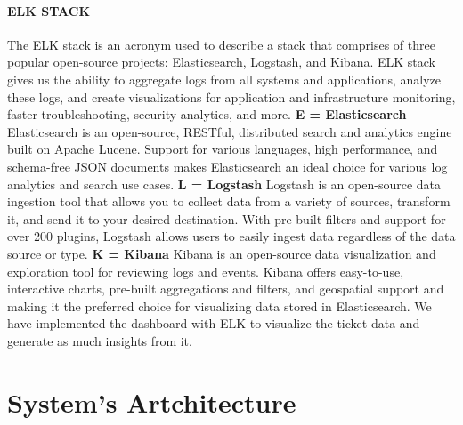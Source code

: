 \documentclass[a4paper,12pt]{report}
\begin{document}
    \subsubsection{ELK STACK}
    The ELK\cite{ELK} stack is an acronym used to describe a stack that comprises of three popular open-source projects: Elasticsearch, Logstash, and Kibana. ELK stack gives us the ability to aggregate logs from all systems and applications, analyze these logs, and create visualizations for application and infrastructure monitoring, faster troubleshooting, security analytics, and more. 
    \newline\newline \textbf{E = Elasticsearch}
    \newline\newline
    Elasticsearch is an open-source, RESTful, distributed search and analytics engine built on Apache Lucene. Support for various languages, high performance, and schema-free JSON documents makes Elasticsearch an ideal choice for various log analytics and search use cases.
    \newline\newline \textbf{L = Logstash}
    \newline\newline
    Logstash is an open-source data ingestion tool that allows you to collect data from a variety of sources, transform it, and send it to your desired destination. With pre-built filters and support for over 200 plugins, Logstash allows users to easily ingest data regardless of the data source or type.
    \newline\newline \textbf{K = Kibana}
    \newline\newline
    Kibana is an open-source data visualization and exploration tool for reviewing logs and events. Kibana offers easy-to-use, interactive charts, pre-built aggregations and filters, and geospatial support and making it the preferred choice for visualizing data stored in Elasticsearch.
    \newline
    We have implemented the dashboard with ELK to visualize the ticket data and generate as much insights from it.


    \chapter{System's Artchitecture}
\end{document}
